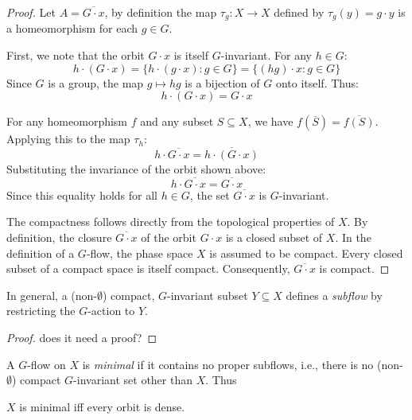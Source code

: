 \begin{proof}
    Let $A = \overline{G \cdot x}$, by definition the map $\tau_g: X \to X$ defined by $\tau_g(y) = g \cdot y$ is a homeomorphism for each $g \in G$.

    First, we note that the orbit $G \cdot x$ is itself $G$-invariant. For any $h \in G$:
    $$h \cdot (G \cdot x) = \{h \cdot (g \cdot x) : g \in G\} = \{(hg) \cdot x : g \in G\}$$
    Since $G$ is a group, the map $g \mapsto hg$ is a bijection of $G$ onto itself. Thus:
    $$h \cdot (G \cdot x) = G \cdot x$$

    For any homeomorphism $f$ and any subset $S \subseteq X$, we have $f(\overline{S}) = \overline{f(S)}$. Applying this to the map $\tau_h$:
    $$h \cdot \overline{G \cdot x} = \overline{h \cdot (G \cdot x)}$$
    Substituting the invariance of the orbit shown above:
    $$h \cdot \overline{G \cdot x} = \overline{G \cdot x}$$
    Since this equality holds for all $h \in G$, the set $\overline{G \cdot x}$ is $G$-invariant.

    The compactness follows directly from the topological properties of \(X\). By definition, the closure \(\overline{G \cdot x}\) of the orbit \(G \cdot x\) is a closed subset of \(X\). In the definition of a \(G\)-flow, the phase space \(X\) is assumed to be compact. Every closed subset of a compact space is itself compact. Consequently, \(\overline{G \cdot x}\) is compact.
\end{proof}



In general, a (non-$\emptyset$) compact, $G$-invariant subset $Y\subseteq X$ defines a {\it subflow} by restricting the $G$-action to $Y$.
\begin{mynote}
    \begin{proof}
        does it need a proof?

    \end{proof}
\end{mynote}

A $G$-flow on $X$ is {\it minimal} if
it contains no proper subflows, i.e., there is no (non-$\emptyset$) compact $G$-invariant set other than $X$.
Thus

\begin{theorem}
    $X$ is minimal iff every orbit is dense.
\end{theorem}

